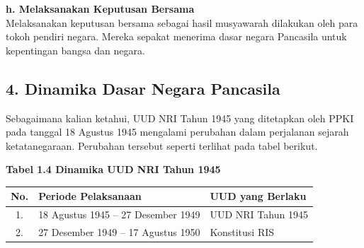 \documentclass[12pt,a4paper]{article}
\begin{document}
\textbf{h. Melaksanakan Keputusan Bersama} \\
Melaksanakan keputusan bersama sebagai hasil musyawarah dilakukan oleh para tokoh pendiri negara. Mereka sepakat menerima dasar negara Pancasila untuk kepentingan bangsa dan negara.

\subsection*{4. Dinamika Dasar Negara Pancasila}
Sebagaimana kalian ketahui, UUD NRI Tahun 1945 yang ditetapkan oleh PPKI pada tanggal 18 Agustus 1945 mengalami perubahan dalam perjalanan sejarah ketatanegaraan. Perubahan tersebut seperti terlihat pada tabel berikut.

\vspace{0.5cm}
\textbf{Tabel 1.4 Dinamika UUD NRI Tahun 1945}
\vspace{0.2cm}

\begin{tabularx}{\textwidth}{|c|X|X|}
\hline
\textbf{No.} & \textbf{Periode Pelaksanaan} & \textbf{UUD yang Berlaku} \\
\hline
1. & 18 Agustus 1945 -- 27 Desember 1949 & UUD NRI Tahun 1945 \\
\hline
2. & 27 Desember 1949 -- 17 Agustus 1950 & Konstitusi RIS \\
\hline
\end{tabularx}

\vspace{1cm}
\begin{center}
\end{center}
\end{document}
